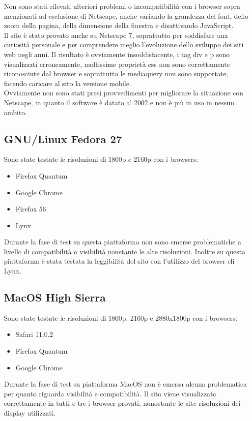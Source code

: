 \documentclass[openany, a4paper, 12pt]{report}
\begin{document}
				Non sono stati rilevati ulteriori problemi o incompatibilità con i browser sopra menzionati ad esclusione di Netscape, anche variando la grandezza del font, dello zoom della pagina, della dimensione della finestra e disattivando JavaScript.\\
				Il sito è stato provato anche su Netscape 7, soprattutto per soddisfare una curiosità personale e per comprendere meglio l'evoluzione dello sviluppo dei siti web negli anni. Il risultato è ovviamente insoddisfacente, i tag div e p sono visualizzati erroneamente, moltissime proprietà css non sono correttamente riconosciute dal browser e soprattutto le mediaquery non sono supportate, facendo caricare al sito la versione mobile.\\
				Ovviamente non sono stati presi provvedimenti per migliorare la situazione con Netscape, in quanto il software è datato al 2002 e non è più in uso in nessun ambito.
				
				\subsection{GNU/Linux Fedora 27}
				Sono state testate le risoluzioni di 1800p e 2160p con i browsers:
				\begin{itemize}
					\item Firefox Quantum
					\item Google Chrome
					\item Firefox 56
					\item Lynx
				\end{itemize}
				Durante la fase di test su questa piattaforma non sono emerse problematiche a livello di compatibilità o visibilità nonstante le alte risoluzioni. Inoltre su questa piattaforma è stata testata la leggibilità del sito con l'utilizzo del browser cli Lynx.

				\subsection{MacOS High Sierra}
				Sono state testate le risoluzioni di 1800p, 2160p e 2880x1800p con i browsers:
				\begin{itemize}
					\item Safari 11.0.2
					\item Firefox Quantum
					\item Google Chrome
				\end{itemize}
				Durante la fase di test su piattaforma MacOS non è emersa alcuna problematica per quanto riguarda visibilità e compatibilità. Il sito viene visualizzato correttamente in tutti e tre i browser provati, nonostante le alte risoluzioni dei display utilizzati.
\end{document}
